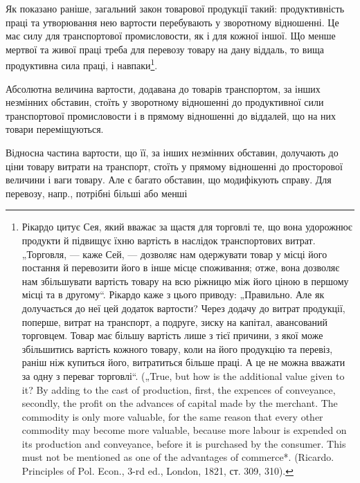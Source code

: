 Як показано раніше, загальний закон товарової продукції такий: продуктивність
праці та утворювання нею вартости перебувають у зворотному
відношенні. Це має силу для транспортової промисловости, як і
для кожної іншої. Що менше мертвої та живої праці треба для перевозу
товару на дану віддаль, то вища продуктивна сила праці, і навпаки\footnote{
Рікардо цитує Сея, який вважає за щастя для торговлі те, що вона удорожнює
продукти й підвищує їхню вартість в наслідок транспортових витрат.
„Торговля, — каже Сей, — дозволяє нам одержувати товар у місці його постання й
перевозити його в інше місце споживання; отже, вона дозволяє нам збільшувати вартість товару на всю
ріжницю між його ціною в першому місці та в другому“.
Рікардо каже з цього приводу: „Правильно. Але як долучається до неї цей додаток
вартости? Через додачу до витрат продукції, поперше, витрат на транспорт,
а подруге, зиску на капітал, авансований торговцем. Товар має більшу вартість
лише з тієї причини, з якої може збільшитись вартість кожного товару, коли на
його продукцію та перевіз, раніш ніж купиться його, витратиться більше праці.
А це не можна вважати за одну з переваг торговлі“. („True, but how is the additional
value given to it? By adding to the cast of production, first, the expences of
conveyance, secondly, the profit on the advances of capital made by the merchant.
The commodity is only more valuable, for the same reason that every other commodity
may become more valuable, because more labour is expended on its production
and conveyance, before it is purchased by the consumer. This must not be
mentioned as one of the advantages of commerce*. (Ricardo. Principles of Pol. Econ.,
3-rd ed., London, 1821, ст. 309, 310).
}.

Абсолютна величина вартости, додавана до товарів транспортом, за
інших незмінних обставин, стоїть у зворотному відношенні до продуктивної
сили транспортової промисловости і в прямому відношенні до віддалей,
що на них товари переміщуються.

Відносна частина вартости, що її, за інших незмінних обставин,
долучають до ціни товару витрати на транспорт, стоїть у прямому відношенні
до просторової величини і ваги товару. Але є багато обставин,
що модифікують справу. Для перевозу, напр., потрібні більші або менші
\parbreak{}  %
